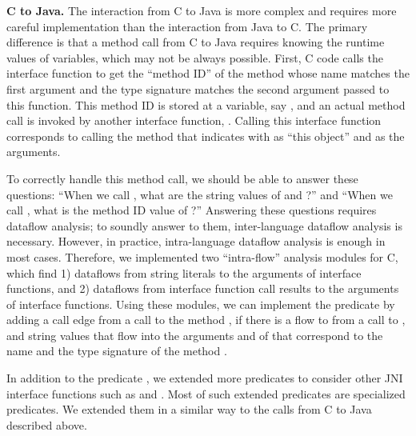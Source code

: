 \medskip
\textbf{C to Java.} The interaction from C to Java is more complex and
requires more careful implementation than the interaction from Java to C.
The primary difference is that a method call from C to Java requires knowing
the runtime values of variables, which may not be always possible.
First, C code calls the interface function 
to get the ``method ID'' of the method whose name matches the first argument
and the type signature matches the second argument passed to this function.
This method ID is stored at a variable, say , and
an actual method call is invoked by another
interface function, . Calling this interface 
function corresponds to calling the method that  indicates
with  as ``this object'' and  as the arguments.

To correctly handle this method call, we should be able to answer these
questions: ``When we call ,
what are the string values of  and ?'' and
``When we call , what is the method ID value of ?''
Answering these questions requires dataflow analysis;
to soundly answer to them, inter-language dataflow analysis is necessary.
However, in practice, intra-language dataflow analysis is enough in most cases.
Therefore, we implemented two ``intra-flow'' analysis modules for C,
which find 1) dataflows from string literals to the arguments of interface functions,
and 2) dataflows from interface function call results to the arguments of interface functions.
Using these modules, we can implement the
predicate  by adding a call edge from a 
call to the method , if there is a flow to  from a
call to , and string values that flow into the
arguments  and  of  that
correspond to the name and the type signature of the method .

In addition to the predicate ,
we extended more predicates to consider other JNI interface functions such as
 and .
Most of such extended predicates are specialized  predicates.
We extended them in a similar way to the calls from C to Java described above.


